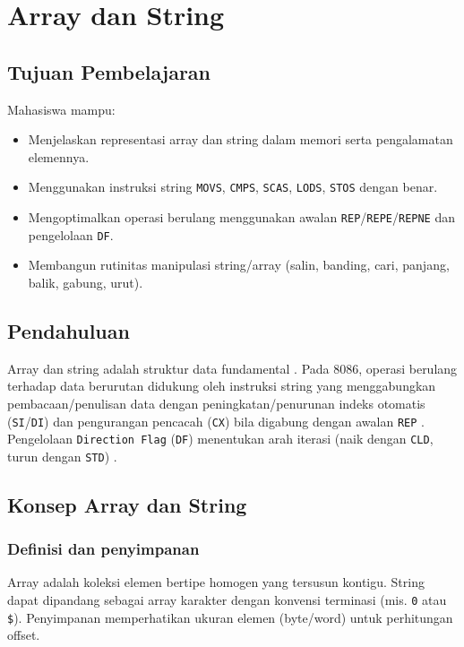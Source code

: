 \chapter{Array dan String}

\section{Tujuan Pembelajaran}
Mahasiswa mampu:
\begin{itemize}
    \item Menjelaskan representasi array dan string dalam memori serta pengalamatan elemennya.
    \item Menggunakan instruksi string \texttt{MOVS}, \texttt{CMPS}, \texttt{SCAS}, \texttt{LODS}, \texttt{STOS} dengan benar.
    \item Mengoptimalkan operasi berulang menggunakan awalan \texttt{REP}/\texttt{REPE}/\texttt{REPNE} dan pengelolaan \texttt{DF}.
    \item Membangun rutinitas manipulasi string/array (salin, banding, cari, panjang, balik, gabung, urut).
\end{itemize}

\section{Pendahuluan}
Array dan string adalah struktur data fundamental \cite{susanto1995belajar}. Pada 8086, operasi berulang terhadap data berurutan didukung oleh instruksi string yang menggabungkan pembacaan/penulisan data dengan peningkatan/penurunan indeks otomatis (\texttt{SI}/\texttt{DI}) dan pengurangan pencacah (\texttt{CX}) bila digabung dengan awalan \texttt{REP} \cite{hyde2010art}. Pengelolaan \texttt{Direction Flag} (\texttt{DF}) menentukan arah iterasi (naik dengan \texttt{CLD}, turun dengan \texttt{STD}) \cite{nopi2003tutorial}.

\section{Konsep Array dan String}
\subsection{Definisi dan penyimpanan}
Array adalah koleksi elemen bertipe homogen yang tersusun kontigu. String dapat dipandang sebagai array karakter dengan konvensi terminasi (mis. \texttt{0} atau \texttt{\$}). Penyimpanan memperhatikan ukuran elemen (byte/word) untuk perhitungan offset.

